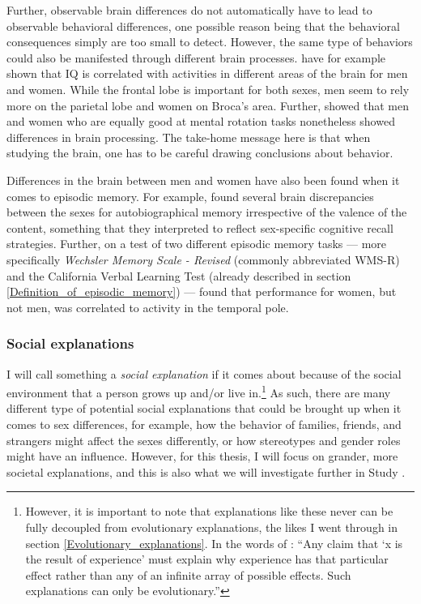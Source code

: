 Further, observable brain differences do not automatically have to lead to observable behavioral differences, one possible reason being that the behavioral consequences simply are too small to detect. However, the same type of behaviors could also be manifested through different brain processes. \textcite{Haier2005} have for example shown that IQ is correlated with activities in different areas of the brain for men and women. While the frontal lobe is important for both sexes, men seem to rely more on the parietal lobe and women on Broca's area. Further, \textcite{Jordan2002} showed that men and women who are equally good at mental rotation tasks nonetheless showed differences in brain processing. The take-home message here is that when studying the brain, one has to be careful drawing conclusions about behavior.

Differences in the brain between men and women have also been found when it comes to episodic memory. For example, \textcite{Young2013} found several brain discrepancies between the sexes for autobiographical memory irrespective of the valence of the content, something that they interpreted to reflect sex-specific cognitive recall strategies. Further, on a test of two different episodic memory tasks --- more specifically \emph{Wechsler Memory Scale - Revised} (commonly abbreviated WMS-R) and the California Verbal Learning Test (already described in section \ref{Definition_of_episodic_memory}) --- \textcite{Ragland2000} found that performance for women, but not men, was correlated to activity in the temporal pole.

\subsubsection{Social explanations} \label{Societal_explanation}

I will call something a \emph{social explanation} if it comes about because of the social environment that a person grows up and/or live in.\footnote{However, it is important to note that explanations like these never can be fully decoupled from evolutionary explanations, the likes I went through in section \ref{Evolutionary_explanations}. In the words of \textcite{Gaulin1992}: ``Any claim that `x is the result of experience' must explain why experience has that particular effect rather than any of an infinite array of possible effects. Such explanations can only be evolutionary.''} As such, there are many different type of potential social explanations that could be brought up when it comes to sex differences, for example, how the behavior of families, friends, and strangers might affect the sexes differently, or how stereotypes and gender roles might have an influence. However, for this thesis, I will focus on grander, more societal explanations, and this is also what we will investigate further in Study .

